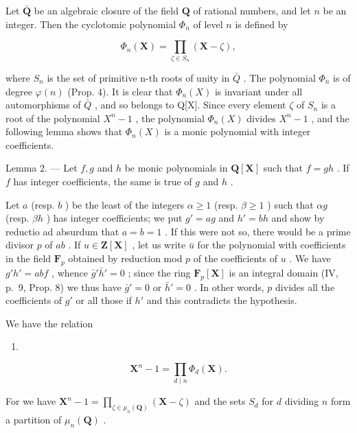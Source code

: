 Let \(\bar{\mathbf{Q}}\) be an algebraic closure of the field \(\mathbf{Q}\) of rational numbers, and let \(n\) be an integer. Then the cyclotomic polynomial \(\Phi_n\) of level \(n\) is defined by

\[
\Phi_ {n} (\mathbf {X}) = \prod_ {\zeta \in S _ {n}} \left(\mathbf {X} - \zeta\right),\tag{5}
\]

where \(S_{n}\) is the set of primitive n-th roots of unity in \(\bar{Q}\) . The polynomial \(\Phi_{n}\) is of degree \(\varphi(n)\) (Prop. 4). It is clear that \(\Phi_{n}(X)\) is invariant under all automorphisms of \(\bar{Q}\) , and so belongs to Q{[}X{]}. Since every element \(\zeta\) of \(S_{n}\) is a root of the polynomial \(X^{n}-1\) , the polynomial \(\Phi_{n}(X)\) divides \(X^{n}-1\) , and the following lemma shows that \(\Phi_{n}(X)\) is a monic polynomial with integer coefficients.

Lemma 2. --- Let \(f, g\) and \(h\) be monic polynomials in \(\mathbf{Q}[\mathbf{X}]\) such that \(f = gh\) . If \(f\) has integer coefficients, the same is true of \(g\) and \(h\) .

Let \(a\) (resp. \(b\) ) be the least of the integers \(\alpha \geqslant 1\) (resp. \(\beta \geqslant 1\) ) such that \(\alpha g\) (resp. \(\beta h\) ) has integer coefficients; we put \(g' = ag\) and \(h' = bh\) and show by reductio ad absurdum that \(a = b = 1\) . If this were not so, there would be a prime divisor \(p\) of \(ab\) . If \(u \in \mathbf{Z}[\mathbf{X}]\) , let us write \(\bar{u}\) for the polynomial with coefficients in the field \(\mathbf{F}_p\) obtained by reduction mod \(p\) of the coefficients of \(u\) . We have \(g'h' = abf\) , whence \(\bar{g}'\bar{h}' = 0\) ; since the ring \(\mathbf{F}_p[\mathbf{X}]\) is an integral domain (IV, p.~9, Prop. 8) we thus have \(\bar{g}' = 0\) or \(\bar{h}' = 0\) . In other words, \(p\) divides all the coefficients of \(g'\) or all those if \(h'\) and this contradicts the hypothesis.

We have the relation

\begin{enumerate}
\def\labelenumi{(\arabic{enumi})}
\setcounter{enumi}{5}
\tightlist
\item
\end{enumerate}

\[
\mathbf {X} ^ {n} - 1 = \prod_ {d \mid n} \Phi_ {d} (\mathbf {X}).
\]

For we have \(\mathbf{X}^n - 1 = \prod_{\zeta \in \mu_n(\mathbf{Q})} (\mathbf{X} - \zeta)\) and the sets \(S_d\) for \(d\) dividing \(n\) form a partition of \(\mu_n(\mathbf{Q})\) .

